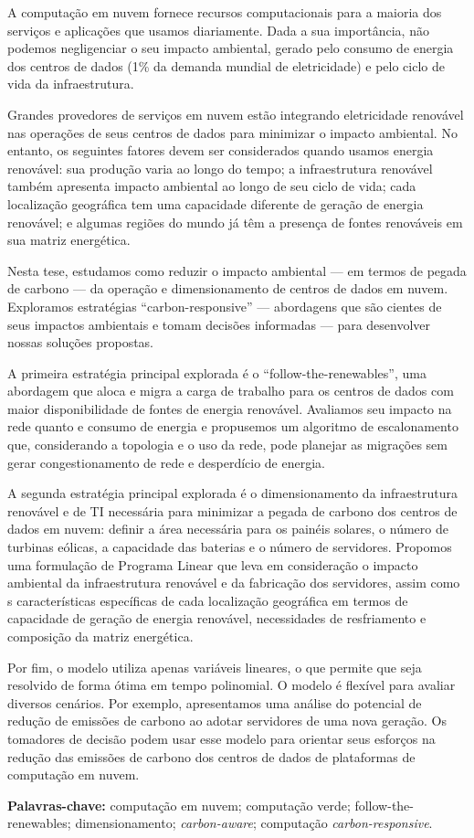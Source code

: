 
A computação em nuvem fornece recursos computacionais para a maioria dos serviços e aplicações que usamos diariamente. Dada a sua importância, não podemos negligenciar o seu impacto ambiental, gerado pelo consumo de energia dos centros de dados (1\% da demanda mundial de eletricidade) e pelo ciclo de vida da infraestrutura.


Grandes provedores de serviços em nuvem estão integrando eletricidade renovável nas operações de seus centros de dados para minimizar o impacto ambiental. No entanto, os seguintes fatores devem ser considerados quando usamos energia renovável: sua produção varia ao longo do tempo; a infraestrutura renovável também apresenta impacto ambiental ao longo de seu ciclo de vida; cada localização geográfica tem uma capacidade diferente de geração de energia renovável; e algumas regiões do mundo já têm a presença de fontes renováveis em sua matriz energética.


Nesta tese, estudamos como reduzir o impacto ambiental --- em termos de pegada de carbono --- da operação e dimensionamento de centros de dados em nuvem. Exploramos estratégias ``carbon-responsive'' --- abordagens que são cientes de seus impactos ambientais e tomam decisões informadas --- para desenvolver nossas soluções propostas.

A primeira estratégia principal explorada é o ``follow-the-renewables'', uma abordagem que aloca e migra a carga de trabalho para os centros de dados com maior disponibilidade de fontes de energia renovável. Avaliamos seu impacto na rede quanto e consumo de energia e propusemos um algoritmo de escalonamento que, considerando a topologia  e o uso da rede, pode planejar as migrações sem gerar congestionamento de rede e desperdício de energia.

A segunda estratégia principal explorada é o dimensionamento da infraestrutura renovável e de TI necessária para minimizar a pegada de carbono dos centros de dados em nuvem: definir a área necessária para os painéis solares, o número de turbinas eólicas, a capacidade das baterias e o número de servidores. Propomos uma formulação de Programa Linear que leva em consideração o impacto ambiental da infraestrutura renovável e da fabricação dos servidores, assim como s características específicas de cada localização geográfica em termos de capacidade de geração de energia renovável, necessidades de resfriamento e composição da matriz energética. 

Por fim, o modelo utiliza apenas variáveis lineares, o que permite que seja resolvido de forma ótima em tempo polinomial. O modelo é flexível para avaliar diversos cenários. Por exemplo, apresentamos uma análise do potencial de redução de emissões de carbono ao adotar servidores de uma nova geração. Os tomadores de decisão podem usar esse modelo para orientar seus esforços na redução das emissões de carbono dos centros de dados de plataformas de computação em nuvem.




\textbf{Palavras-chave:} computação em nuvem; computação verde; follow-the-renewables; dimensionamento; \textit{carbon-aware}; computação \textit{carbon-responsive}. 
